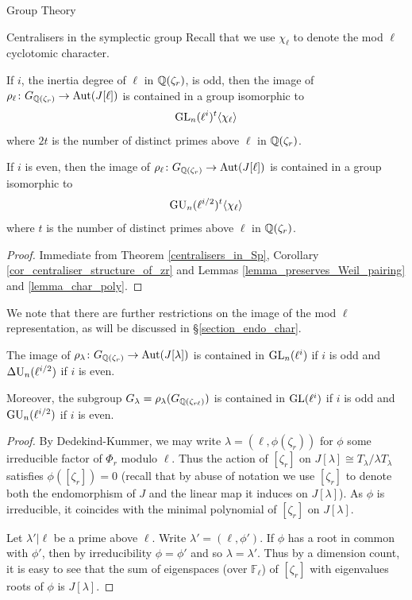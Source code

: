 \documentclass[11pt,a4paper]{article}
\newcommand{\Fl}{\mathbb{F}_\ell}
\newcommand{\rcyclo}{\QQ(\zeta_r)}
\newcommand{\GQr}{G_{\QQ(\zeta_{r})}}
\newcommand{\GQrl}{G_{\QQ(\zeta_{r\ell})}}
\newcommand{\zr}{\zeta_r}
\begin{document}
\begin{section}{Group Theory}
\begin{subsection}{Centralisers in the symplectic group}
Recall that we use $\chi_\ell$ to denote the mod $\ell$ cyclotomic character.

\begin{theorem}
    If $i$, the inertia degree of $\ell$ in $\rcyclo$, is odd, then the image of $\rho_\ell\colon \GQr \rightarrow \Aut(J[\ell])$ is contained in a group isomorphic to
$$\GL_{n}(\ell^i)^{t} \langle \chi_\ell \rangle$$
where  $2t$ is the number of distinct primes above $\ell$ in $\rcyclo$.

If $i$ is even, then the image of $\rho_\ell\colon\GQr \rightarrow \Aut(J[\ell])$ is contained in a group isomorphic to
$$\GU_{n}(\ell^{i/2})^t\langle \chi_\ell\rangle$$
where $t$ is the number of distinct primes above $\ell$ in $\rcyclo$.
\end{theorem}

\begin{proof}
Immediate from Theorem \ref{centralisers_in_Sp}, Corollary \ref{cor_centraliser_structure_of_zr} and Lemmas \ref{lemma_preserves_Weil_pairing} and \ref{lemma_char_poly}.
\end{proof}

We note that there are further restrictions on the image of the mod $\ell$ representation, as will be discussed in \S \ref{section_endo_char}.


\begin{theorem}
\label{thm_containment_of_the_image_of_GQr_and_GQrl}
The image of $\rho_\lambda \colon \GQr \rightarrow \Aut(J[\lambda])$ is contained in $\GL_n(\ell^i)$ if $i$ is odd and $\DU_n(\ell^{i/2})$ if $i$ is even.

Moreover, the subgroup $G_\lambda = \rho_\lambda(\GQrl)$ is contained in $\GL(\ell^i)$ if $i$ is odd and $\GU_n(\ell^{i/2})$ if $i$ is even.
\end{theorem}

\begin{proof}
    By Dedekind-Kummer, we may write $\lambda=(\ell, \phi(\zr))$ for $\phi$ some irreducible factor of $\Phi_r$ modulo $\ell$.
    Thus the action of $[\zr]$ on $J[\lambda] \cong T_\lambda/\lambda T_\lambda$ satisfies $\phi([\zr])=0$ (recall that by abuse of notation we use $[\zr]$ to denote both the endomorphism of $J$ and the linear map it induces on $J[\lambda]$).
    As $\phi$ is irreducible, it coincides with the minimal polynomial of $[\zr]$ on $J[\lambda]$.

    Let $\lambda'|\ell$ be a prime above $\ell$.
    Write $\lambda' = (\ell, \phi')$.
    If $\phi$ has a root in common with $\phi'$, then by irreducibility $\phi=\phi'$ and so $\lambda = \lambda'$.
    Thus by a dimension count, it is easy to see that the sum of eigenspaces (over $\Fl$) of $[\zr]$ with eigenvalues roots of $\phi$ is $J[\lambda]$.


\end{proof}
\end{subsection}
\end{section}
\end{document}
